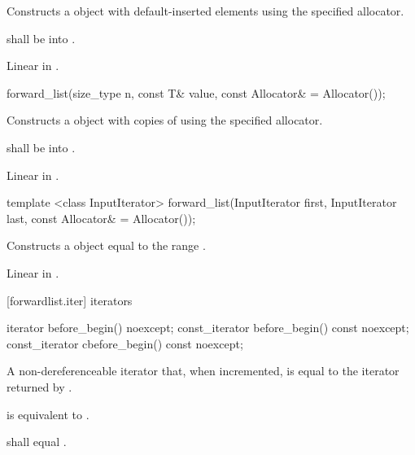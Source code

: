 \begin{itemdescr}
\pnum
\effects Constructs a  object with 
default-inserted elements using the specified allocator.

\pnum
\requires {} shall be  into .

\pnum
\complexity Linear in .
\end{itemdescr}

%
\begin{itemdecl}
forward_list(size_type n, const T& value, const Allocator& = Allocator());
\end{itemdecl}

\begin{itemdescr}
\pnum
\effects Constructs a  object with  copies of  using the specified allocator.

\pnum
\requires {} shall be  into .

\pnum
\complexity Linear in .
\end{itemdescr}

%
\begin{itemdecl}
template <class InputIterator>
  forward_list(InputIterator first, InputIterator last, const Allocator& = Allocator());
\end{itemdecl}

\begin{itemdescr}
\pnum
\effects Constructs a  object equal to the range .

\pnum
\complexity Linear in .
\end{itemdescr}

[forwardlist.iter]{ iterators}

%
%
\begin{itemdecl}
iterator before_begin() noexcept;
const_iterator before_begin() const noexcept;
const_iterator cbefore_begin() const noexcept;
\end{itemdecl}

\begin{itemdescr}
\pnum
\returns A non-dereferenceable iterator that, when incremented, is equal to the iterator
returned by .

\pnum
\effects {} is equivalent to
.

\pnum
\remarks {} shall equal .
\end{itemdescr}

